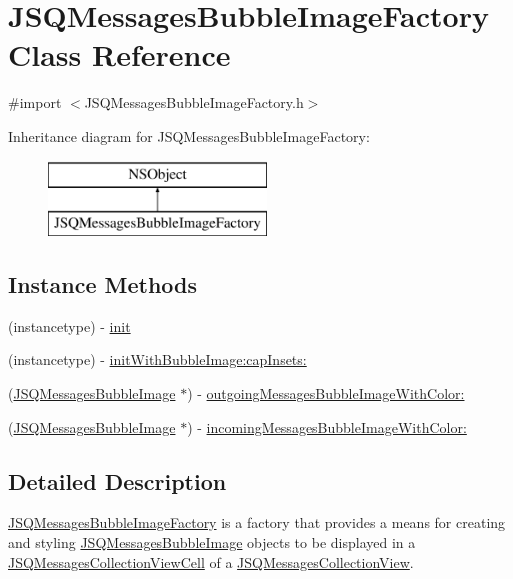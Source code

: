 \hypertarget{interface_j_s_q_messages_bubble_image_factory}{}\section{J\+S\+Q\+Messages\+Bubble\+Image\+Factory Class Reference}
\label{interface_j_s_q_messages_bubble_image_factory}


{\ttfamily \#import $<$J\+S\+Q\+Messages\+Bubble\+Image\+Factory.\+h$>$}

Inheritance diagram for J\+S\+Q\+Messages\+Bubble\+Image\+Factory\+:\begin{figure}[H]
\begin{center}
\leavevmode
\includegraphics[height=2.000000cm]{interface_j_s_q_messages_bubble_image_factory}
\end{center}
\end{figure}
\subsection*{Instance Methods}
\begin{DoxyCompactItemize}
\item 
(instancetype) -\/ \hyperlink{interface_j_s_q_messages_bubble_image_factory_a0eaab6e319e38ff4b978a9e9fd437f33}{init}
\item 
(instancetype) -\/ \hyperlink{interface_j_s_q_messages_bubble_image_factory_abb1e5a23279319a1671730e248659431}{init\+With\+Bubble\+Image\+:cap\+Insets\+:}
\item 
(\hyperlink{interface_j_s_q_messages_bubble_image}{J\+S\+Q\+Messages\+Bubble\+Image} $\ast$) -\/ \hyperlink{interface_j_s_q_messages_bubble_image_factory_a1e19dc173f93d8114612e06f66b14c46}{outgoing\+Messages\+Bubble\+Image\+With\+Color\+:}
\item 
(\hyperlink{interface_j_s_q_messages_bubble_image}{J\+S\+Q\+Messages\+Bubble\+Image} $\ast$) -\/ \hyperlink{interface_j_s_q_messages_bubble_image_factory_a334d63b9cd2ac93799a88761017b9b0e}{incoming\+Messages\+Bubble\+Image\+With\+Color\+:}
\end{DoxyCompactItemize}


\subsection{Detailed Description}
{\ttfamily \hyperlink{interface_j_s_q_messages_bubble_image_factory}{J\+S\+Q\+Messages\+Bubble\+Image\+Factory}} is a factory that provides a means for creating and styling {\ttfamily \hyperlink{interface_j_s_q_messages_bubble_image}{J\+S\+Q\+Messages\+Bubble\+Image}} objects to be displayed in a {\ttfamily \hyperlink{interface_j_s_q_messages_collection_view_cell}{J\+S\+Q\+Messages\+Collection\+View\+Cell}} of a {\ttfamily \hyperlink{interface_j_s_q_messages_collection_view}{J\+S\+Q\+Messages\+Collection\+View}}. 


